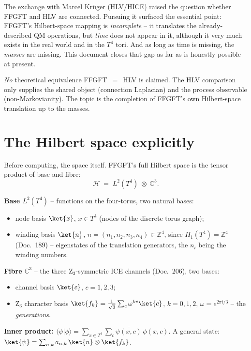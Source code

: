 The exchange with Marcel Kr\"uger (HLV/HICE) raised the question whether FFGFT
and HLV are connected. Pursuing it surfaced the essential point: FFGFT's
Hilbert-space mapping is \emph{incomplete} -- it translates the
already-described QM operations, but \emph{time} does not appear in it, although
it very much exists in the real world and in the $T^4$ tori. And as long as
time is missing, the \emph{masses} are missing. This document closes that gap
as far as is honestly possible at present.

\begin{important}
\emph{No} theoretical equivalence FFGFT~$=$~HLV is claimed. The HLV comparison
only supplies the shared object (connection Laplacian) and the process
observable (non-Markovianity). The topic is the completion of FFGFT's own
Hilbert-space translation up to the masses.
\end{important}

\section{The Hilbert space explicitly}

Before computing, the space itself. FFGFT's full Hilbert space is the tensor
product of base and fibre:
\begin{equation}
  \mathcal{H}\;=\;L^2(T^4)\;\otimes\;\mathbb{C}^3 .
\end{equation}

\begin{notationBox}
\textbf{Base $L^2(T^4)$} -- functions on the four-torus, two natural bases:
\begin{itemize}
  \item node basis $\ket{x}$, $x\in T^4$ (nodes of the discrete torus graph);
  \item winding basis $\ket{n}$, $n=(n_1,n_2,n_3,n_4)\in\mathbb{Z}^4$, since
        $H_1(T^4)=\mathbb{Z}^4$ (Doc.~189) -- eigenstates of the translation
        generators, the $n_i$ being the winding numbers.
\end{itemize}
\textbf{Fibre $\mathbb{C}^3$} -- the three Z$_3$-symmetric ICE channels
(Doc.~206), two bases:
\begin{itemize}
  \item channel basis $\ket{c}$, $c=1,2,3$;
  \item Z$_3$ character basis
        $\ket{f_k}=\tfrac{1}{\sqrt3}\sum_c\omega^{kc}\ket{c}$, $k=0,1,2$,
        $\omega=e^{2\pi i/3}$ -- the \emph{generations}.
\end{itemize}
\textbf{Inner product:} $\langle\psi|\phi\rangle=\sum_{x\in T^4}\sum_c
\overline{\psi(x,c)}\,\phi(x,c)$. A general state:
$\ket{\psi}=\sum_{n,k}a_{n,k}\,\ket{n}\otimes\ket{f_k}$.
\end{notationBox}

